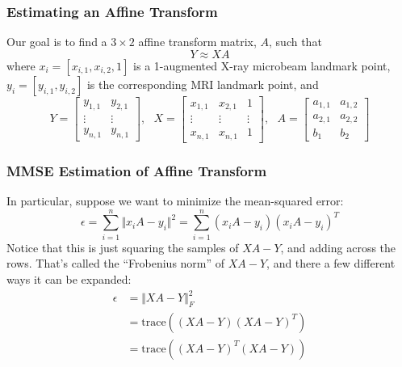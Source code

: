 \documentclass{beamer}
\begin{document}
\begin{frame}
  \frametitle{Estimating an Affine Transform}

  Our goal is to find a $3\times 2$ affine transform matrix, $A$, such that
  \begin{displaymath}
    Y\approx XA
  \end{displaymath}
  where $x_i=[x_{i,1},x_{i,2},1]$ is a 1-augmented X-ray microbeam
  landmark point, $y_i=[y_{i,1},y_{i,2}]$ is the corresponding MRI
  landmark point, and
  \begin{displaymath}
    Y=\left[\begin{array}{cc}
        y_{1,1}&y_{2,1}\\
        \vdots&\vdots\\
        y_{n,1}&y_{n,1}
      \end{array}\right],~~~
    X=\left[\begin{array}{ccc}
        x_{1,1}&x_{2,1}&1\\
        \vdots&\vdots&\vdots\\
        x_{n,1}&x_{n,1}&1
      \end{array}\right],~~~
    A=\left[\begin{array}{cc}
        a_{1,1}&a_{1,2}\\
        a_{2,1}&a_{2,2}\\
        b_1&b_2\end{array}\right]
  \end{displaymath}
\end{frame}
    
\begin{frame}
  \frametitle{MMSE Estimation of Affine Transform}

  In particular, suppose we want to minimize the mean-squared error:
  \begin{displaymath}
    \epsilon = \sum_{i=1}^n\Vert x_iA-y_i\Vert^2=\sum_{i=1}^n(x_iA-y_i)(x_iA-y_i)^T
  \end{displaymath}
  Notice that this is just squaring the samples of $XA-Y$, and adding
  across the rows.  That's called the ``Frobenius norm'' of $XA-Y$,
  and there a few different ways it can be expanded:
  \begin{align*}
    \epsilon &= \Vert XA-Y\Vert_F^2\\
    &=\text{trace}\left((XA-Y)(XA-Y)^T\right)\\
    &=\text{trace}\left((XA-Y)^T(XA-Y)\right)\\
  \end{align*}
\end{frame}
\end{document}

